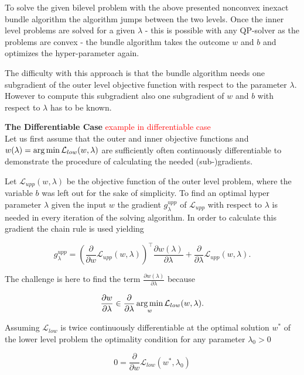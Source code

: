 To solve the given bilevel problem with the above presented nonconvex inexact bundle algorithm the algorithm jumps between the two levels. Once the inner level problems are solved for a given \(\lambda\) - this is possible with any QP-solver as the problems are convex - the bundle algorithm takes the outcome \(w\) and \(b\) and optimizes the hyper-parameter again.

The difficulty with this approach is that the bundle algorithm needs one subgradient of the outer level objective function with respect to the parameter \(\lambda\). However to compute this subgradient also one subgradient of \(w\) and \(b\) with respect to \(\lambda\) has to be known.

\textbf{The Differentiable Case}
\textcolor{red}{example in differentiable case}\\
Let us first assume that the outer and inner objective functions and \(w(\lambda)= \operatorname*{arg\,min} \mathcal{L}_{low}(w,\lambda)\) are sufficiently often continuously differentiable to demonstrate the procedure of calculating the needed {(sub-)gradients}.

Let \(\mathcal{L}_{upp}(w,\lambda)\) be the objective function of the outer level problem, where the variable \(b\) was left out for the sake of simplicity.
To find an optimal hyper parameter \(\lambda\) given the input \(w\) the gradient \(g^{upp}_{\lambda}\) of \(\mathcal{L}_{upp}\) with respect to \(\lambda\) is needed in every iteration of the solving algorithm.
In order to calculate this gradient the chain rule is used yielding

\begin{equation*}
	g^{upp}_{\lambda} = \left(\frac{\partial}{\partial w}\mathcal{L}_{upp}(w,\lambda) \right)^{\top}\frac{\partial w(\lambda)}{\partial\lambda}+\frac{\partial}{\partial \lambda}\mathcal{L}_{upp}(w,\lambda).
\end{equation*}

The challenge is here to find the term \(\frac{\partial w(\lambda)}{\partial\lambda}\) because 

\[ \frac{\partial w}{\partial \lambda} \in \frac{\partial }{\partial \lambda} \operatorname*{arg\,min}_{w} \mathcal{L}_{low}(w,\lambda). \]

Assuming \(\mathcal{L}_{low}\) is twice continuously differentiable at the  optimal solution \(w^*\) of the lower level problem the optimality condition for any parameter \(\lambda_0 > 0\)

\begin{equation}
	0 = \frac{\partial}{\partial w}\mathcal{L}_{low}(w^*,\lambda_0)
\label{opt_con}
\end{equation}


